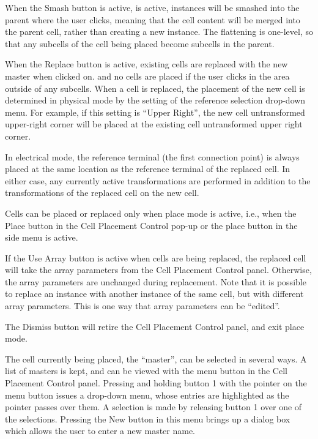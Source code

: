 When the {\cb Smash} button is active, is active, instances will be
smashed into the parent where the user clicks, meaning that the cell
content will be merged into the parent cell, rather than creating a
new instance.  The flattening is one-level, so that any subcells of
the cell being placed become subcells in the parent.

When the {\cb Replace} button is active, existing cells are replaced
with the new master when clicked on.  and no cells are placed if the
user clicks in the area outside of any subcells.  When a cell is
replaced, the placement of the new cell is determined in physical mode
by the setting of the reference selection
drop-down menu.  For example, if this setting is ``Upper Right'', the new cell
untransformed upper-right corner will be placed at the existing cell
untransformed upper right corner.

In electrical mode, the reference terminal (the first connection
point) is always placed at the same location as the reference terminal
of the replaced cell.  In either case, any currently active
transformations are performed in addition to the transformations of
the replaced cell on the new cell.

Cells can be placed or replaced only when place mode is active, i.e.,
when the {\cb Place} button in the {\cb Cell Placement Control} pop-up
or the {\cb place} button in the side menu is active.

If the {\cb Use Array} button is active when cells are being replaced,
the replaced cell will take the array parameters from the {\cb Cell
Placement Control} panel.  Otherwise, the array parameters are
unchanged during replacement.  Note that it is possible to replace an
instance with another instance of the same cell, but with different
array parameters.  This is one way that array parameters can be
``edited''.

The {\cb Dismiss} button will retire the {\cb Cell Placement Control}
panel, and exit place mode.

The cell currently being placed, the ``master'', can be selected in
several ways.  A list of masters is kept, and can be viewed with the
menu button in the {\cb Cell Placement Control} panel.  Pressing and
holding button 1 with the pointer on the menu button issues a
drop-down menu, whose entries are highlighted as the pointer passes
over them.  A selection is made by releasing button 1 over one of the
selections.  Pressing the {\cb New} button in this menu brings up a
dialog box which allows the user to enter a new master name.

